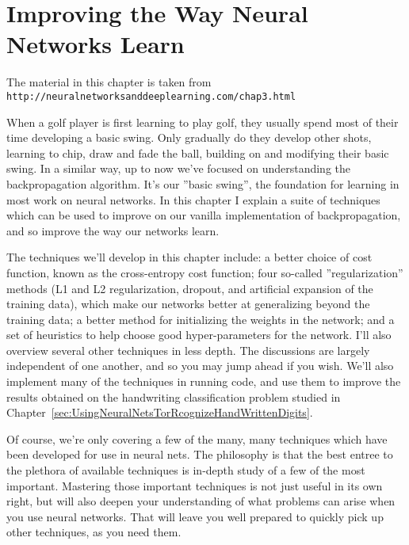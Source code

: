 
\chapter{Improving the Way Neural Networks Learn}
\label{sec:ImprovingTheWayNeuralNetworksLearn}

The material in this chapter is taken from\\
\lstinline{http://neuralnetworksanddeeplearning.com/chap3.html}

When a golf player is first learning to play golf, they usually spend most of their time developing a basic swing. Only gradually do they develop other shots, learning to chip, draw and fade the ball, building on and modifying their basic swing. In a similar way, up to now we've focused on understanding the backpropagation algorithm. It's our ''basic swing'', the foundation for learning in most work on neural networks. In this chapter I explain a suite of techniques which can be used to improve on our vanilla implementation of backpropagation, and so improve the way our networks learn.

The techniques we'll develop in this chapter include: a better choice of cost function, known as the cross-entropy cost function; four so-called ''regularization'' methods (L1 and L2 regularization, dropout, and artificial expansion of the training data), which make our networks better at generalizing beyond the training data; a better method for initializing the weights in the network; and a set of heuristics to help choose good hyper-parameters for the network. I'll also overview several other techniques in less depth. The discussions are largely independent of one another, and so you may jump ahead if you wish. We'll also implement many of the techniques in running code, and use them to improve the results obtained on the handwriting classification problem studied in Chapter~\ref{sec:UsingNeuralNetsTorRcognizeHandWrittenDigits}.

Of course, we're only covering a few of the many, many techniques which have been developed for use in neural nets. The philosophy is that the best entree to the plethora of available techniques is in-depth study of a few of the most important. Mastering those important techniques is not just useful in its own right, but will also deepen your understanding of what problems can arise when you use neural networks. That will leave you well prepared to quickly pick up other techniques, as you need them.


